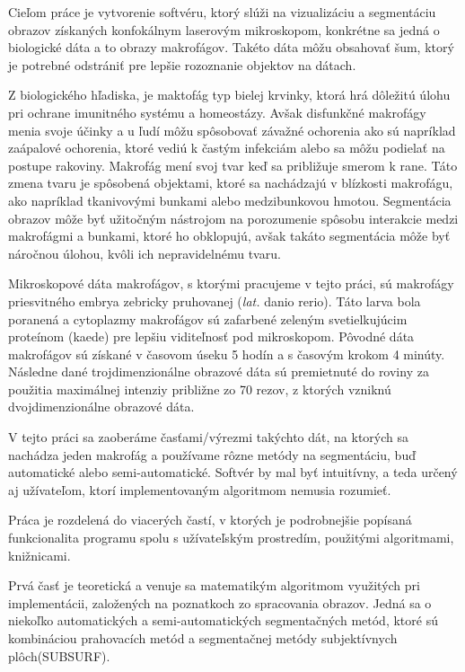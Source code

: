 \documentclass[a4paper,11pt,twoside]{article}%
\begin{document}
Cieľom práce je vytvorenie softvéru, ktorý slúži na vizualizáciu a segmentáciu obrazov získaných konfokálnym laserovým mikroskopom, konkrétne sa jedná o biologické dáta a to obrazy makrofágov. Takéto dáta môžu obsahovať šum, ktorý je potrebné odstrániť pre lepšie rozoznanie objektov na dátach. 
 
Z biologického hľadiska, je maktofág typ bielej krvinky, ktorá hrá dôležitú úlohu pri ochrane imunitného systému a homeostázy. Avšak disfunkčné makrofágy menia svoje účinky a u ľudí môžu spôsobovať závažné ochorenia ako sú napríklad  zaápalové ochorenia, ktoré vediú k častým infekciám alebo sa môžu podielať na postupe rakoviny. Makrofág mení svoj tvar keď sa približuje smerom k rane. Táto zmena tvaru je spôsobená objektami, ktoré sa nachádzajú v blízkosti makrofágu, ako napríklad tkanivovými bunkami alebo medzibunkovou hmotou.
Segmentácia obrazov môže byť užitočným nástrojom na porozumenie spôsobu interakcie medzi makrofágmi a bunkami, ktoré ho obklopujú, avšak takáto segmentácia môže byť náročnou úlohou, kvôli ich nepravidelnému tvaru.

Mikroskopové dáta makrofágov, s ktorými pracujeme v tejto práci, sú makrofágy priesvitného embrya zebricky pruhovanej (\textit{lat.} danio rerio). Táto larva bola poranená a cytoplazmy makrofágov sú zafarbené zeleným svetielkujúcim proteínom (kaede) pre lepšiu viditeľnosť pod mikroskopom. Pôvodné dáta makrofágov sú získané v časovom úseku 5 hodín a s časovým krokom 4 minúty. Následne dané trojdimenzionálne obrazové dáta sú premietnuté do roviny za použitia maximálnej intenziy približne zo 70 rezov, z ktorých vzniknú dvojdimenzionálne obrazové dáta. 

V tejto práci sa zaoberáme časťami/výrezmi takýchto dát, na ktorých sa nachádza jeden makrofág a používame rôzne metódy na segmentáciu, buď automatické alebo semi-automatické. Softvér by mal byť intuitívny, a teda určený aj užívateľom, ktorí implementovaným algoritmom nemusia rozumieť. 
  
Práca je rozdelená do viacerých častí, v ktorých je podrobnejšie popísaná funkcionalita programu spolu s užívateľským prostredím, použitými algoritmami, knižnicami.

Prvá časť je teoretická a venuje sa matematikým algoritmom využitých pri implementácii, založených na poznatkoch zo spracovania obrazov. Jedná sa o niekoľko automatických a semi-automatických segmentačných metód, ktoré sú kombináciou prahovacích metód a segmentačnej metódy subjektívnych plôch(SUBSURF).
\end{document}
